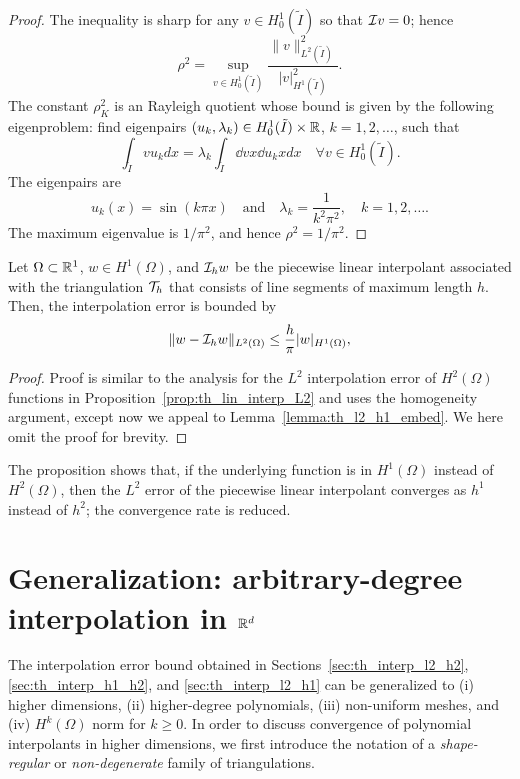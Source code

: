 \begin{proposition}
\begin{proof}
  The inequality is sharp for any $v \in H^1_0(\tilde I)$ so that $\mathcal{I} v = 0$; hence
   \begin{equation*} 
     \rho^2 =\sup_{v \in H^1_0(\tilde I)} \frac{\| v \|^2_{L^2(\tilde I)}}{| v |_{H^1(\tilde I)}^2}.
  \end{equation*}
  The constant $\rho_K^2$ is an Rayleigh quotient whose bound is given by the following eigenproblem: find eigenpairs $(u_k,\lambda_k) \in H^1_0(\tilde I) \times \mathbb{R}$, $k = 1,2,\dots$, such that
  \begin{equation*}
    \int_{\tilde I} v u_k dx = \lambda_k \int_{\tilde I} \dd{v}{x} \dd{u_k}{x} dx \quad \forall v \in H^1_0(\tilde I).
  \end{equation*}
  The eigenpairs are
  \begin{equation*}
    u_k(x) = \sin(k\pi x) \quad \text{and} \quad \lambda_k = \frac{1}{k^2\pi^2}, \quad k = 1,2,\dots.
  \end{equation*}
  The maximum eigenvalue is $1/\pi^2$, and hence $\rho^2 = 1/\pi^2$.
\end{proof}
\end{proposition}

\begin{proposition}
  \label{prop:th_lin_interp_L2_H1}
  Let $\Omega \subset \mathbb{R}^1$, $w \in H^1(\Omega)$, and $\mathcal{I}_h w$ be the piecewise linear interpolant associated with the triangulation $\mathcal{T}_h$ that consists of line segments of maximum length $h$. Then, the interpolation error is bounded by
  \begin{equation*}
    \| w - \mathcal{I}_h w \|_{L^2(\Omega)}
    \leq \frac{h}{\pi} | w |_{H^1(\Omega)},
  \end{equation*}
  \begin{proof}
    Proof is similar to the analysis for the $L^2$ interpolation error of $H^2(\Omega)$ functions in Proposition~\ref{prop:th_lin_interp_L2} and uses the homogeneity argument, except now we appeal to Lemma~\ref{lemma:th_l2_h1_embed}. We here omit the proof for brevity.
  \end{proof}
\end{proposition}
The proposition shows that, if the underlying function is in $H^1(\Omega)$ instead of $H^2(\Omega)$, then the $L^2$ error of the piecewise linear interpolant converges as $h^1$ instead of $h^2$; the convergence rate is reduced. 

\section{Generalization: arbitrary-degree interpolation in $\mathbb{R}^d$}
The interpolation error bound obtained in Sections~\ref{sec:th_interp_l2_h2}, \ref{sec:th_interp_h1_h2}, and \ref{sec:th_interp_l2_h1} can be generalized to (i) higher dimensions, (ii) higher-degree polynomials, (iii) non-uniform meshes, and (iv) $H^k(\Omega)$ norm for $k \geq 0$.  In order to discuss convergence of polynomial interpolants in higher dimensions, we first introduce the notation of a \emph{shape-regular} or \emph{non-degenerate} family of triangulations.


